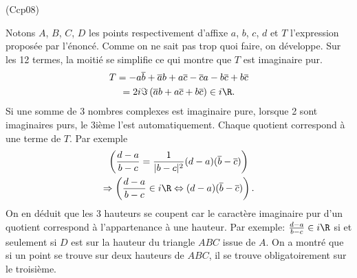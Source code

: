 \begin{tiny}(Ccp08)\end{tiny} Notons $A$, $B$, $C$, $D$ les points respectivement d'affixe $a$, $b$, $c$, $d$ et $T$ l'expression proposée par l'énoncé. Comme on ne sait pas trop quoi faire, on développe. Sur les 12 termes, la moitié se simplifie ce qui montre que $T$ est imaginaire pur.
\begin{multline*}
 T = -a\overline{b} + \overline{a}b  + a\overline{c} - \overline{c} a -b\overline{c} + b\overline{c}\\
 = 2i\Im\left( \overline{a}b  + a\overline{c} + b\overline{c} \right) \in i\R.
\end{multline*}
Si une somme de 3 nombres complexes est imaginaire pure, lorsque 2 sont imaginaires purs, le 3ième l'est automatiquement. Chaque quotient correspond à une terme de $T$. Par exemple
\begin{multline*}
 \left( \frac{d-a}{b-c} = \frac{1}{|b-c|^2}(d-a)(\overline{b} - \overline{c}) \right) \\
 \Rightarrow
\left( \frac{d-a}{b-c} \in i\R \Leftrightarrow (d-a)(\overline{b} - \overline{c})\right) .
\end{multline*}
On en déduit que les 3 hauteurs se coupent car le caractère imaginaire pur d'un quotient correspond à l'appartenance à une hauteur. Par exemple:
$ \frac{d-a}{b-c} \in i\R$ si et seulement si $D$ est sur la hauteur du triangle $ABC$ issue de $A$.\newline
On a montré que si un point se trouve sur deux hauteurs de $ABC$, il se trouve obligatoirement sur le troisième.


